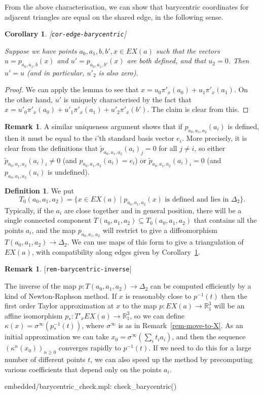 \documentclass[reqno]{amsart}
\newcommand{\lbl}[1]{\label{#1}\textup{[\texttt{#1}]}\par}
\newcommand{\lbl}{\label}
\newcommand{\Dl}        {\Delta}
\newcommand{\kp}        {\kappa}
\newcommand{\sg}        {\sigma}
\newcommand{\R}         {{\mathbb{R}}}
\newcommand{\st}        {\;|\;}
\newcommand{\sse}       {\subseteq}
\renewcommand{\:}{\colon}
\newtheorem{corollary}[theorem]{Corollary}
\theoremstyle{definition}
\newtheorem{remark}[theorem]{Remark}
\newtheorem{definition}[theorem]{Definition}
\begin{document}
From the above characterisation, we can show that barycentric
coordinates for adjacent triangles are equal on the shared edge, in
the following sense.

\begin{corollary}\lbl{cor-edge-barycentric}
 Suppose we have points $a_0,a_1,b,b',x\in EX(a)$ such that the vectors
 $u=p_{a_0,a_1,b}(x)$ and $u'=p_{a_0,a_1,b'}(x)$ are both defined, and
 that $u_2=0$.  Then $u'=u$ (and in particular, $u'_2$ is also zero).
\end{corollary}
\begin{proof}
 We can apply the lemma to see that
 $x=u_0\pi'_x(a_0)+u_1\pi'_x(a_1)$.  On the other hand, $u'$ is
 uniquely characterised by the fact that
 $x=u'_0\pi'_x(a_0)+u'_1\pi'_x(a_1)+u'_2\pi'_x(b')$.  The claim is
 clear from this.
\end{proof}

\begin{remark}
 A similar uniqueness argument shows that if $p_{a_0,a_1,a_2}(a_i)$ is
 defined, then it must be equal to the $i$'th standard basis vector
 $e_i$.  More precisely, it is clear from the definitions that
 $\widetilde{p}_{a_0,a_1,a_2}(a_i)_j=0$ for all $j\neq i$, so either
 $\widetilde{p}_{a_0,a_1,a_2}(a_i)_i\neq 0$ (and
 $p_{a_0,a_1,a_2}(a_i)=e_i$) or $\widetilde{p}_{a_0,a_1,a_2}(a_i)_i=0$
 (and $p_{a_0,a_1,a_2}(a_i)$ is undefined).
\end{remark}

\begin{definition}
 We put
 \[ T_0(a_0,a_1,a_2) = \{x\in EX(a)\st p_{a_0,a_1,a_2}(x)
     \text{ is defined and lies in } \Dl_2 \}.
 \]
 Typically, if the $a_i$ are close together and in general position,
 there will be a single connected component
 $T(a_0,a_1,a_2)\sse T_0(a_0,a_1,a_2)$ that contains all the points
 $a_i$, and the map $p_{a_0,a_1,a_2}$ will restrict to give a
 diffeomorphism $T(a_0,a_1,a_2)\to\Dl_2$.  We can use maps of this
 form to give a triangulation of $EX(a)$, with compatibility along edges
 given by Corollary~\ref{cor-edge-barycentric}.
\end{definition}

\begin{remark}\lbl{rem-barycentric-inverse}
 The inverse of the map $p\:T(a_0,a_1,a_2)\to\Dl_2$ can be computed
 efficiently by a kind of Newton-Raphson method.  If $x$ is reasonably
 close to $p^{-1}(t)$ then the first order Taylor approximation at $x$
 to the map $p\:EX(a)\to\R^3_1$ will be an affine isomorphism
 $p_*\:T'_xEX(a)\to\R^3_1$, so we can define
 $\kp(x)=\sg^{\infty}(p_*^{-1}(t))$, where $\sg^\infty$ is as in
 Remark~\ref{rem-move-to-X}.  As an initial approximation we can take
 $x_0=\sg^{\infty}(\sum_it_ia_i)$, and then the sequence
 $(\kp^n(x_0))_{n\geq 0}$ converges rapidly to $p^{-1}(t)$.  If we
 need to do this for a large number of different points $t$, we can
 also speed up the method by precomputing various coefficients that
 depend only on the points $a_i$.
 \begin{checks}
  embedded/barycentric_check.mpl: check_barycentric()
 \end{checks}
\end{remark}
\end{document}
